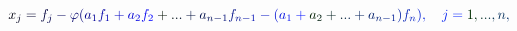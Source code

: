 \documentclass[12pt]{article}
\begin{document}
\makeatletter
\renewcommand*{\@textcolor}[3]{%
  \protect\leavevmode
  \begingroup
    \color#1{#2}#3%
  \endgroup
}
\makeatother
\begin{displaymath}
\mathcolor[RGB]{0,0,15}{x} _ { \mathcolor[RGB]{0,0,30}{j} } \mathcolor[RGB]{0,0,45}{=} \mathcolor[RGB]{0,0,60}{f} _ { \mathcolor[RGB]{0,0,75}{j} } \mathcolor[RGB]{0,0,90}{-} \mathcolor[RGB]{0,0,105}{\varphi} \mathcolor[RGB]{0,0,120}{(} \mathcolor[RGB]{0,0,135}{a} _ { \mathcolor[RGB]{0,0,150}{1} } \mathcolor[RGB]{0,0,165}{f} _ { \mathcolor[RGB]{0,0,180}{1} } \mathcolor[RGB]{0,0,195}{+} \mathcolor[RGB]{0,0,210}{a} _ { \mathcolor[RGB]{0,0,225}{2} } \mathcolor[RGB]{0,0,240}{f} _ { \mathcolor[RGB]{0,0,255}{2} } \mathcolor[RGB]{0,15,0}{+} \mathcolor[RGB]{0,15,15}{.} \mathcolor[RGB]{0,15,30}{.} \mathcolor[RGB]{0,15,45}{.} \mathcolor[RGB]{0,15,60}{+} \mathcolor[RGB]{0,15,75}{a} _ { \mathcolor[RGB]{0,15,90}{n} \mathcolor[RGB]{0,15,105}{-} \mathcolor[RGB]{0,15,120}{1} } \mathcolor[RGB]{0,15,135}{f} _ { \mathcolor[RGB]{0,15,150}{n} \mathcolor[RGB]{0,15,165}{-} \mathcolor[RGB]{0,15,180}{1} } \mathcolor[RGB]{0,15,195}{-} \mathcolor[RGB]{0,15,210}{(} \mathcolor[RGB]{0,15,225}{a} _ { \mathcolor[RGB]{0,15,240}{1} } \mathcolor[RGB]{0,15,255}{+} \mathcolor[RGB]{0,30,0}{a} _ { \mathcolor[RGB]{0,30,15}{2} } \mathcolor[RGB]{0,30,30}{+} \mathcolor[RGB]{0,30,45}{.} \mathcolor[RGB]{0,30,60}{.} \mathcolor[RGB]{0,30,75}{.} \mathcolor[RGB]{0,30,90}{+} \mathcolor[RGB]{0,30,105}{a} _ { \mathcolor[RGB]{0,30,120}{n} \mathcolor[RGB]{0,30,135}{-} \mathcolor[RGB]{0,30,150}{1} } \mathcolor[RGB]{0,30,165}{)} \mathcolor[RGB]{0,30,180}{f} _ { \mathcolor[RGB]{0,30,195}{n} } \mathcolor[RGB]{0,30,210}{)} \mathcolor[RGB]{0,30,225}{,} \quad \mathcolor[RGB]{0,30,240}{j} \mathcolor[RGB]{0,30,255}{=} \mathcolor[RGB]{0,45,0}{1} \mathcolor[RGB]{0,45,15}{,} \mathcolor[RGB]{0,45,30}{.} \mathcolor[RGB]{0,45,45}{.} \mathcolor[RGB]{0,45,60}{.} \mathcolor[RGB]{0,45,75}{,} \mathcolor[RGB]{0,45,90}{n} \mathcolor[RGB]{0,45,105}{,}
\end{displaymath}
\end{document}
